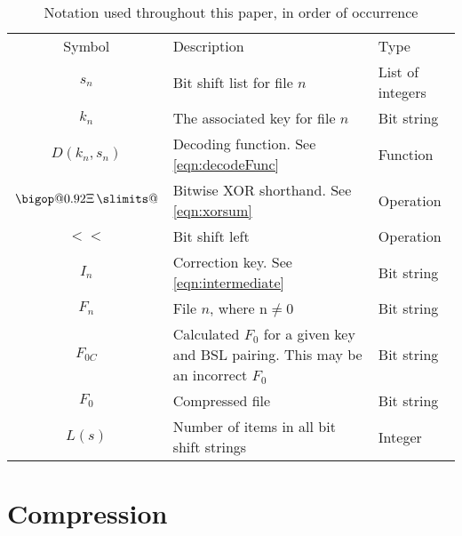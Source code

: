 \documentclass{hehe}
\makeatletter
\DeclareRobustCommand\bigop[2][1]{%
  \mathop{\vphantom{\sum}\mathpalette\bigop@{{#1}{#2}}}\slimits@
}
\newcommand{\bigop@}[2]{\bigop@@#1#2}
\newcommand{\bigop@@}[3]{%
  \vcenter{%
    \sbox\z@{$#1\sum$}%
    \hbox{\resizebox{\ifx#1\displaystyle#2\fi\dimexpr\ht\z@+\dp\z@}{!}{$\m@th#3$}}%
  }%
}
\newcommand{\XORsum}{\DOTSB\bigop[0.92]{\Xi}}
\makeatother
\begin{document}
\begin{table}[ht]
    \centering
    \begin{tabular}{c >{\raggedleft\arraybackslash}p{5.5cm} >{\raggedleft\arraybackslash}p{3cm}}
        \hline
        Symbol & Description & Type \\
        \Xhline{3\arrayrulewidth}
        $s_n$ & Bit shift list for file $n$ & List of integers \\
        $k_n$ & The associated key for file $n$ & Bit string \\
        $D(k_n,s_n)$ & Decoding function. See \cref{eqn:decodeFunc} & Function \\
        $\XORsum$ & Bitwise XOR shorthand. See \cref{eqn:xorsum} & Operation \\
        $<<$ & Bit shift left & Operation \\
        $I_n$ & Correction key. See \cref{eqn:intermediate} & Bit string \\
        $F_n$ & File $n$, where n$\neq0$ & Bit string \\
        $F_{0C}$ & Calculated $F_0$ for a given key and BSL pairing. This may be an incorrect $F_0$ & Bit
        string \\
        $F_0$ & Compressed file & Bit string \\
        $L(s)$ & Number of items in all bit shift strings & Integer\\
        \hline
    \end{tabular}
    \caption{Notation used throughout this paper, in order of occurrence}
    \label{tab:notationTable}
\end{table}

\section{Compression}
\end{document}
